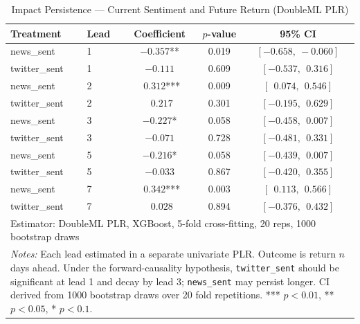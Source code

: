 \begin{table}[htbp]
\centering
\caption{Impact Persistence --- Current Sentiment and Future Return (DoubleML PLR)\label{tab:impact_persist}}
\small
\begin{tabular}{llccc}
\hline\hline
Treatment & Lead & Coefficient & $p$-value & 95\% CI \\
\hline
news\_sent    & 1 & $-0.357$**  & 0.019 & $[-0.658,\ -0.060]$ \\
twitter\_sent & 1 & $-0.111$    & 0.609 & $[-0.537,\ \ 0.316]$ \\
news\_sent    & 2 & $\ \ 0.312$*** & 0.009 & $[\ \ 0.074,\ \ 0.546]$ \\
twitter\_sent & 2 & $\ \ 0.217$    & 0.301 & $[-0.195,\ \ 0.629]$ \\
news\_sent    & 3 & $-0.227$*   & 0.058 & $[-0.458,\ \ 0.007]$ \\
twitter\_sent & 3 & $-0.071$    & 0.728 & $[-0.481,\ \ 0.331]$ \\
news\_sent    & 5 & $-0.216$*   & 0.058 & $[-0.439,\ \ 0.007]$ \\
twitter\_sent & 5 & $-0.033$    & 0.867 & $[-0.420,\ \ 0.355]$ \\
news\_sent    & 7 & $\ \ 0.342$*** & 0.003 & $[\ \ 0.113,\ \ 0.566]$ \\
twitter\_sent & 7 & $\ \ 0.028$    & 0.894 & $[-0.376,\ \ 0.432]$ \\
\hline
\multicolumn{5}{l}{Estimator: DoubleML PLR, XGBoost, 5-fold cross-fitting, 20 reps, 1000 bootstrap draws} \\
\hline\hline
\multicolumn{5}{p{0.95\linewidth}}{\footnotesize \textit{Notes:} Each lead estimated in a separate univariate PLR. Outcome is return $n$ days ahead. Under the forward-causality hypothesis, \texttt{twitter\_sent} should be significant at lead 1 and decay by lead 3; \texttt{news\_sent} may persist longer. CI derived from 1000 bootstrap draws over 20 fold repetitions. *** $p<0.01$, ** $p<0.05$, * $p<0.1$.} \\
\end{tabular}
\end{table}
